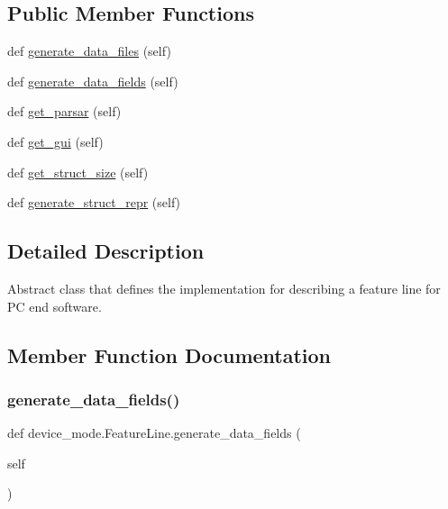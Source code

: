 \subsection*{Public Member Functions}
\begin{DoxyCompactItemize}
\item 
def \hyperlink{classdevice__mode_1_1FeatureLine_a1abbb99081dc21c569cba237c859dae5}{generate\+\_\+data\+\_\+files} (self)
\item 
def \hyperlink{classdevice__mode_1_1FeatureLine_a6223a227b982c9eec4035c5d9f3f7e3c}{generate\+\_\+data\+\_\+fields} (self)
\item 
def \hyperlink{classdevice__mode_1_1FeatureLine_a6f2c5a624f255bd290ff74a9f3a29291}{get\+\_\+parsar} (self)
\item 
def \hyperlink{classdevice__mode_1_1FeatureLine_a828523120c977cfd677a8c5146906400}{get\+\_\+gui} (self)
\item 
def \hyperlink{classdevice__mode_1_1FeatureLine_a05270169f8fe514acc1238d70bde0f12}{get\+\_\+struct\+\_\+size} (self)
\item 
def \hyperlink{classdevice__mode_1_1FeatureLine_a2f9a39132e28fc061bb16c96f7e8177e}{generate\+\_\+struct\+\_\+repr} (self)
\end{DoxyCompactItemize}


\subsection{Detailed Description}
\begin{DoxyVerb}Abstract class that defines the implementation for 
describing a feature line for PC end software. 
\end{DoxyVerb}
 

\subsection{Member Function Documentation}
\mbox{\label{classdevice__mode_1_1FeatureLine_a6223a227b982c9eec4035c5d9f3f7e3c}} 
\subsubsection{\texorpdfstring{generate\+\_\+data\+\_\+fields()}{generate\_data\_fields()}}
{\footnotesize\ttfamily def device\+\_\+mode.\+Feature\+Line.\+generate\+\_\+data\+\_\+fields (\begin{DoxyParamCaption}\item[{}]{self }\end{DoxyParamCaption})}

